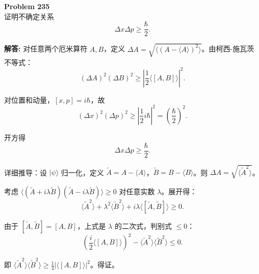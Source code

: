 \documentclass[12pt, a4paper, oneside]{ctexart}
\newenvironment{solution}{\par\noindent\textbf{解答:}\quad}{\par}
\begin{document}
\begin{mdframed}[backgroundcolor=gray!10, linewidth=0pt]
    \textbf{Problem 235} \\
    证明不确定关系
    \[
    \Delta x \Delta p \ge \frac{\hbar}{2}.
    \]
\end{mdframed}
\begin{solution}
    对任意两个厄米算符 $A, B$，定义 $\Delta A = \sqrt{\langle (A - \langle A \rangle)^2 \rangle}$。由柯西-施瓦茨不等式：
    \[
    (\Delta A)^2 (\Delta B)^2 \ge \left| \frac{1}{2} \langle [A,B] \rangle \right|^2.
    \]
    
    对位置和动量，$[x,p] = i\hbar$，故
    \[
    (\Delta x)^2 (\Delta p)^2 \ge \left| \frac{1}{2} i\hbar \right|^2 = \left( \frac{\hbar}{2} \right)^2.
    \]
    
    开方得
    \[
    \Delta x \Delta p \ge \frac{\hbar}{2}.
    \]
    
    详细推导：设 $|\psi\rangle$ 归一化，定义 $\tilde{A} = A - \langle A \rangle$，$\tilde{B} = B - \langle B \rangle$。则 $\Delta A = \sqrt{\langle \tilde{A}^2 \rangle}$。
    
    考虑 $\langle (\tilde{A} + i\lambda \tilde{B}) (\tilde{A} - i\lambda \tilde{B}) \rangle \ge 0$ 对任意实数 $\lambda$。展开得：
    \[
    \langle \tilde{A}^2 \rangle + \lambda^2 \langle \tilde{B}^2 \rangle + i\lambda \langle [\tilde{A}, \tilde{B}] \rangle \ge 0.
    \]
    
    由于 $[\tilde{A},\tilde{B}] = [A,B]$，上式是 $\lambda$ 的二次式，判别式 $\le 0$：
    \[
    \left( \frac{i}{2} \langle [A,B] \rangle \right)^2 - \langle \tilde{A}^2 \rangle \langle \tilde{B}^2 \rangle \le 0.
    \]
    
    即 $\langle \tilde{A}^2 \rangle \langle \tilde{B}^2 \rangle \ge \frac{1}{4} |\langle [A,B] \rangle|^2$。得证。
\end{solution}
\end{document}

